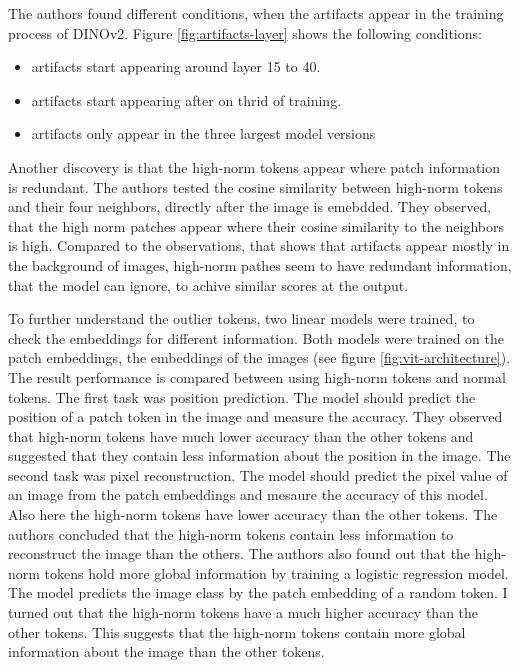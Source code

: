 \documentclass[conference]{IEEEtran}
\begin{document}
  The authors found different conditions, when the artifacts appear in the training process of DINOv2. Figure \ref{fig:artifacts-layer} shows the following conditions:
  \begin{itemize}
    \item artifacts start appearing around layer 15 to 40.
    \item artifacts start appearing after on thrid of training.
    \item artifacts only appear in the three largest model versions
  \end{itemize}


  Another discovery is that the high-norm tokens appear where patch information is redundant. The authors tested the cosine similarity between high-norm tokens and their four neighbors, directly after the image is emebdded. They observed, that the high norm patches appear where their cosine similarity to the neighbors is high. Compared to the observations, that shows that artifacts appear mostly in the background of images, high-norm pathes seem to have redundant information, that the model can ignore, to achive similar scores at the output.

  To further understand the outlier tokens, two linear models were trained, to check the embeddings for different information. Both models were trained on the patch embeddings, the embeddings of the images (see figure \ref{fig:vit-architecture}). The result performance is compared between using high-norm tokens and normal tokens. The first task was position prediction. The model should predict the position of a patch token in the image and measure the accuracy. They observed that high-norm tokens have much lower accuracy than the other tokens and suggested that they contain less information about the position in the image. The second task was pixel reconstruction. The model should predict the pixel value of an image from the patch embeddings and mesaure the accuracy of this model. Also here the high-norm tokens have  lower accuracy than the other tokens. The authors concluded that the high-norm tokens contain less information to reconstruct the image than the others. 
  The authors also found out that the high-norm tokens hold more global information by training a logistic regression model. The model predicts the image class by the patch embedding of a random token. I turned out that the high-norm tokens have a much higher accuracy than the other tokens. This suggests that the high-norm tokens contain more global information about the image than the other tokens. 
\end{document}
